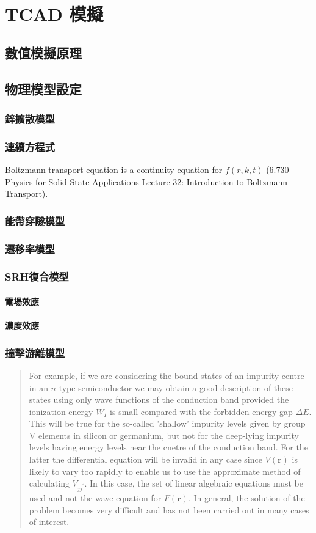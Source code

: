 \chapter{TCAD 模擬}\label{c:modeling}
\section{數值模擬原理}
\section{物理模型設定}
\subsection{鋅擴散模型}
\subsection{連續方程式}
Boltzmann transport equation is a continuity equation for $f(r,k,t)$ (6.730 Physics for Solid State Applications Lecture 32: Introduction to Boltzmann Transport).
\subsection{能帶穿隧模型}
\subsection{遷移率模型}
\subsection{SRH復合模型}
\subsubsection{電場效應}
\subsubsection{濃度效應}
\subsection{撞擊游離模型}
\begin{quote}
For example, if we are considering the bound states of an impurity centre in an $n$-type semiconductor we may obtain a good description of these states using only wave functions of the conduction band provided the ionization energy $W_I$ is small compared with the forbidden energy gap $\Delta E$. This will be true for the so-called 'shallow' impurity levels given by group V elements in silicon or germanium, but not for the deep-lying impurity levels having energy levels near the cnetre of the conduction band. For the latter the differential equation will be invalid in any case since $V(\mathbf{r})$ is likely to vary too rapidly to enable us to use the approximate method of calculating $V_{jj^\prime}$. In this case, the set of linear algebraic equations must be used and not the wave equation for $F(\mathbf{r})$. In general, the solution of the problem becomes very difficult and has not been carried out in many cases of interest.~\cite{smith1963wave}
\end{quote}
